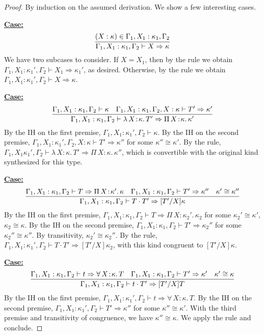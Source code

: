 \documentclass{article}
\newcommand{\abs}[4]{{#1}\, #2\! : \! #3.\, #4}
\newcommand{\tpsynth}[0]{\Rightarrow}
\newcommand{\startcase}[1]{\vspace{#1} \noindent\textbf{\underline{Case:}}}
\begin{document}
\begin{proof}
  By induction on the assumed derivation.
  We show a few interesting cases.

  \startcase{.2cm}
  \[
    \infer{\Gamma_1,X_1:\kappa_1,\Gamma_2 \vdash X \tpsynth \kappa}{(X : \kappa) \in \Gamma_1,X_1:\kappa_1,\Gamma_2}
  \]
  We have two subcases to consider.
  If \(X = X_1\), then by the rule we obtain \(\Gamma_1,X_1:\kappa_1',\Gamma_2
  \vdash X_1 \tpsynth \kappa_1'\), as desired.
  Otherwise, by the rule we obtain \(\Gamma_1,X_1:\kappa_1',\Gamma_2
  \vdash X \tpsynth \kappa\).

  \startcase{.2cm}
  \[
    \infer{
      \Gamma_1,X_1:\kappa_1,\Gamma_2 \vdash \abs{\lambda}{X}{\kappa}{T'} \tpsynth
      \abs{\Pi}{X}{\kappa}{\kappa'}
    }{
      \Gamma_1,X_1:\kappa_1,\Gamma_2 \vdash \kappa
      & \Gamma_1,X_1:\kappa_1,\Gamma_2,X:\kappa \vdash  T' \tpsynth \kappa'
    }
  \]
  By the IH on the first premise, \(\Gamma_1,X_1:\kappa_1',\Gamma_2 \vdash
  \kappa\).
  By the IH on the second premise, \(\Gamma_1,X_1:\kappa_1',\Gamma_2,X:\kappa
  \vdash T' \tpsynth \kappa''\) for some \(\kappa'' \cong \kappa'\).
  By the rule, \(\Gamma_1,X_1\kappa_1',\Gamma_2 \vdash
  \abs{\lambda}{X}{\kappa}{T'} \tpsynth \abs{\Pi}{X}{\kappa}{\kappa''}\), which
  is convertible with the original kind synthesized for this type.

  \startcase{.2cm}
  \[
    \infer{
      \Gamma_1,X_1:\kappa_1,\Gamma_2 \vdash T \cdot T' \tpsynth
      [T'/X]\kappa
    }{
      \Gamma_1,X_1:\kappa_1,\Gamma_2 \vdash T \tpsynth
      \abs{\Pi}{X}{\kappa'}{\kappa}
      & \Gamma_1,X_1:\kappa_1,\Gamma_2 \vdash T' \tpsynth \kappa''
      & \kappa' \cong \kappa''}
  \]
  By the IH on the first premise, \(\Gamma_1,X_1:\kappa_1,\Gamma_2 \vdash T
  \tpsynth \abs{\Pi}{X}{\kappa_2'}{\kappa_2}\) for some \(\kappa_2' \cong
  \kappa'\), \(\kappa_2 \cong \kappa\).
  By the IH on the second premise, \(\Gamma_1,X_1:\kappa_1,\Gamma_2 \vdash T'
  \tpsynth \kappa_2''\) for some \(\kappa_2'' \cong \kappa''\).
  By transitivity, \(\kappa_2' \cong \kappa_2''\).
  By the rule, \(\Gamma_1,X_1:\kappa_1',\Gamma_2 \vdash T \cdot T' \tpsynth
  [T'/X]\kappa_2\), with this kind congruent to \([T'/X]\kappa\).

  \startcase{.2cm}
  \[
    \infer{
      \Gamma_1,X_1:\kappa_1,\Gamma_2 \vdash t \cdot T' \tpsynth [T'/X]T
    }{
      \Gamma_1,X_1:\kappa_1,\Gamma_2\vdash t \tpsynth
      \abs{\forall}{X}{\kappa}{T}
      & \Gamma_1,X_1:\kappa_1,\Gamma_2 \vdash T' \tpsynth \kappa'
      & \kappa'\cong\kappa
    }
  \]
  By the IH on the first premise, \(\Gamma_1,X_1:\kappa_1',\Gamma_2 \vdash t
  \tpsynth \abs{\forall}{X}{\kappa}{T}\).
  By the IH on the second premise, \(\Gamma_1,X_1:\kappa_1',\Gamma_2 \vdash T'
  \tpsynth \kappa''\) for some \(\kappa'' \cong \kappa'\).
  With the third premise and transitivity of congruence, we have \(\kappa''
  \cong \kappa\).
  We apply the rule and conclude.
\end{proof}
\end{document}
